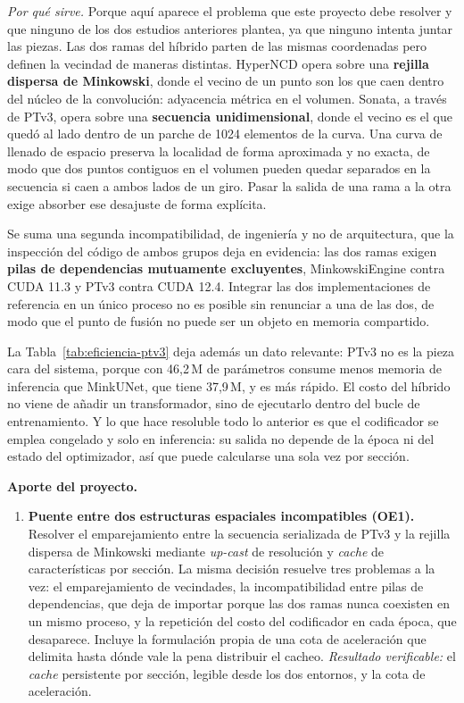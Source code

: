 \emph{Por qué sirve.} Porque aquí aparece el problema que este proyecto debe
resolver y que ninguno de los dos estudios anteriores plantea, ya que ninguno
intenta juntar las piezas. Las dos ramas del híbrido parten de las mismas
coordenadas pero definen la vecindad de maneras distintas. HyperNCD opera sobre
una \textbf{rejilla dispersa de Minkowski}, donde el vecino de un punto son los
que caen dentro del núcleo de la convolución: adyacencia métrica en el volumen.
Sonata, a través de PTv3, opera sobre una \textbf{secuencia unidimensional},
donde el vecino es el que quedó al lado dentro de un parche de 1024 elementos de
la curva. Una curva de llenado de espacio preserva la localidad de forma
aproximada y no exacta, de modo que dos puntos contiguos en el volumen pueden
quedar separados en la secuencia si caen a ambos lados de un giro. Pasar la
salida de una rama a la otra exige absorber ese desajuste de forma explícita.

Se suma una segunda incompatibilidad, de ingeniería y no de arquitectura, que la
inspección del código de ambos grupos deja en evidencia: las dos ramas exigen
\textbf{pilas de dependencias mutuamente excluyentes}, MinkowskiEngine contra
CUDA 11.3 y PTv3 contra CUDA 12.4. Integrar las dos implementaciones de
referencia en un único proceso no es posible sin renunciar a una de las dos, de
modo que el punto de fusión no puede ser un objeto en memoria compartido.

La Tabla~\ref{tab:eficiencia-ptv3} deja además un dato relevante: PTv3 no es la
pieza cara del sistema, porque con 46,2\,M de parámetros consume menos memoria de
inferencia que MinkUNet, que tiene 37,9\,M, y es más rápido. El costo del híbrido
no viene de añadir un transformador, sino de ejecutarlo dentro del bucle de
entrenamiento. Y lo que hace resoluble todo lo anterior es que el codificador se
emplea congelado y solo en inferencia: su salida no depende de la época ni del
estado del optimizador, así que puede calcularse una sola vez por sección.

\textbf{Aporte del proyecto.}

\begin{enumerate}
\item[\textbf{A4}] \textbf{Puente entre dos estructuras espaciales incompatibles
(OE1).} Resolver el emparejamiento entre la secuencia serializada de PTv3 y la
rejilla dispersa de Minkowski mediante \emph{up-cast} de resolución y
\emph{cache} de características por sección. La misma decisión resuelve tres
problemas a la vez: el emparejamiento de vecindades, la incompatibilidad entre
pilas de dependencias, que deja de importar porque las dos ramas nunca coexisten
en un mismo proceso, y la repetición del costo del codificador en cada época, que
desaparece. Incluye la formulación propia de una cota de aceleración que delimita
hasta dónde vale la pena distribuir el cacheo. \emph{Resultado verificable:} el
\emph{cache} persistente por sección, legible desde los dos entornos, y la cota
de aceleración.
\end{enumerate}

